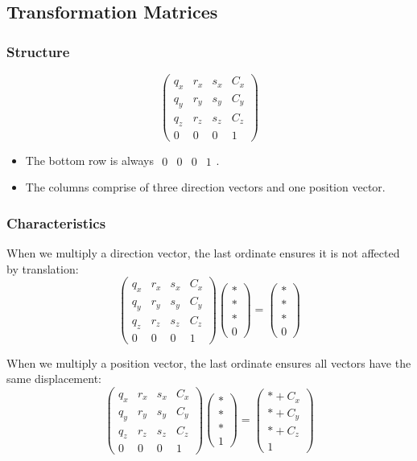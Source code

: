 \documentclass[11pt]{article}
\begin{document}
\subsection{Transformation Matrices}
\subsubsection{Structure}
\[
  \begin{pmatrix}
    q_x & r_x & s_x & C_x \\
    q_y & r_y & s_y & C_y \\
    q_z & r_z & s_z & C_z \\
    0 & 0 & 0 & 1
  \end{pmatrix}
\]
\begin{itemize}
  \item The bottom row is always $\begin{matrix}0&0&0&1\end{matrix}$.
  \item The columns comprise of three direction vectors and one position vector.
\end{itemize}

\subsubsection{Characteristics}
When we multiply a direction vector, the last ordinate ensures it is not affected by translation:
\[
  \begin{pmatrix}
    q_x & r_x & s_x & C_x \\
    q_y & r_y & s_y & C_y \\
    q_z & r_z & s_z & C_z \\
    0 & 0 & 0 & 1
  \end{pmatrix}
  \begin{pmatrix} * \\ * \\ * \\ 0 \end{pmatrix}
  =
  \begin{pmatrix} * \\ * \\ * \\ 0 \end{pmatrix}
\]

When we multiply a position vector, the last ordinate ensures all vectors have the same displacement:
\[
  \begin{pmatrix}
    q_x & r_x & s_x & C_x \\
    q_y & r_y & s_y & C_y \\
    q_z & r_z & s_z & C_z \\
    0 & 0 & 0 & 1
  \end{pmatrix}
  \begin{pmatrix} * \\ * \\ * \\ 1 \end{pmatrix}
  =
  \begin{pmatrix} * + C_x \\ * + C_y \\ * + C_z \\ 1 \end{pmatrix}
\]
\end{document}
